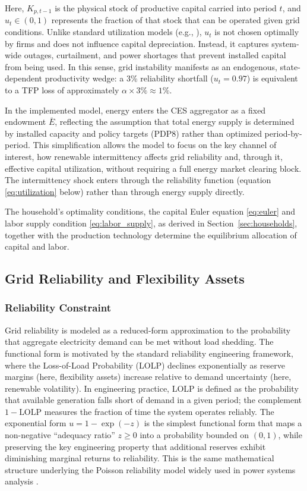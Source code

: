 \documentclass[12pt, a4paper]{article}
\begin{document}
	Here, $K_{p,t-1}$ is the physical stock of productive capital carried into period $t$, and $u_t \in (0,1)$ represents the fraction of that stock that can be operated given grid conditions. Unlike standard utilization models (e.g., \citet{greenwood1988}), $u_t$ is not chosen optimally by firms and does not influence capital depreciation. Instead, it captures system-wide outages, curtailment, and power shortages that prevent installed capital from being used. In this sense, grid instability manifests as an endogenous, state-dependent productivity wedge: a 3\% reliability shortfall ($u_t = 0.97$) is equivalent to a TFP loss of approximately $\alpha \times 3\% \approx 1\%$.
	
	In the implemented model, energy enters the CES aggregator as a fixed endowment $\bar{E}$, reflecting the assumption that total energy supply is determined by installed capacity and policy targets (PDP8) rather than optimized period-by-period. This simplification allows the model to focus on the key channel of interest, how renewable intermittency affects grid reliability and, through it, effective capital utilization, without requiring a full energy market clearing block. The intermittency shock enters through the reliability function (equation \eqref{eq:utilization} below) rather than through energy supply directly.
	
	The household's optimality conditions, the capital Euler equation \eqref{eq:euler} and labor supply condition \eqref{eq:labor_supply}, as derived in Section~\ref{sec:households}, together with the production technology determine the equilibrium allocation of capital and labor.
	
	\subsection{Grid Reliability and Flexibility Assets}
	
	\subsubsection{Reliability Constraint}
	
	Grid reliability is modeled as a reduced-form approximation to the probability that aggregate electricity demand can be met without load shedding. The functional form is motivated by the standard reliability engineering framework, where the Loss-of-Load Probability (LOLP) declines exponentially as reserve margins (here, flexibility assets) increase relative to demand uncertainty (here, renewable volatility). In engineering practice, LOLP is defined as the probability that available generation falls short of demand in a given period; the complement $1 - \text{LOLP}$ measures the fraction of time the system operates reliably. The exponential form $u = 1 - \exp(-z)$ is the simplest functional form that maps a non-negative ``adequacy ratio'' $z \geq 0$ into a probability bounded on $(0,1)$, while preserving the key engineering property that additional reserves exhibit diminishing marginal returns to reliability. This is the same mathematical structure underlying the Poisson reliability model widely used in power systems analysis \citep{zakeri2015, lund2015}.
	
\end{document}
